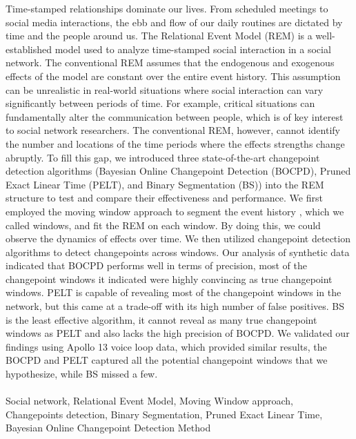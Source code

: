 \documentclass[]{interact}
\theoremstyle{plain}%
\theoremstyle{definition}
\theoremstyle{remark}
\begin{document}
	\small{Time-stamped relationships dominate our lives. From scheduled meetings to social media interactions, the ebb and flow of our daily routines are dictated by time and the people around us. The Relational Event Model (REM) is a well-established model used to analyze time-stamped social interaction in a social network. The conventional REM assumes that the endogenous and exogenous effects of the model are constant over the entire event history. This assumption can be unrealistic in real-world situations where social interaction can vary significantly between periods of time. For example, critical situations can fundamentally alter the communication between people, which is of key interest to social network researchers. The conventional REM, however, cannot identify the number and locations of the time periods where the effects strengths change abruptly. To fill this gap, we introduced three state-of-the-art changepoint detection algorithms (Bayesian Online Changepoint Detection (BOCPD), Pruned Exact Linear Time (PELT), and Binary Segmentation (BS)) into the REM structure to test and compare their effectiveness and performance. We first employed the moving window approach to segment the event history , which we called windows, and fit the REM on each window. By doing this, we could observe the dynamics of effects over time. We then utilized changepoint detection algorithms to detect changepoints across windows. Our analysis of synthetic data indicated that BOCPD performs well in terms of precision, most of the changepoint windows it indicated were highly convincing as true changepoint windows. PELT is capable of revealing most of the changepoint windows in the network, but this came at a trade-off with its high number of false positives. BS is the least effective algorithm, it cannot reveal as many true changepoint windows as PELT and also lacks the high precision of BOCPD. We validated our findings using Apollo 13 voice loop data, which provided similar results, the BOCPD and PELT captured all the potential changepoint windows that we hypothesize, while BS missed a few.} \\
	
	 \\
	\small{Social network, Relational Event Model, Moving Window approach, Changepoints detection, Binary Segmentation, Pruned Exact Linear Time, Bayesian Online Changepoint Detection Method} \\
	
	\newpage
\end{document}
